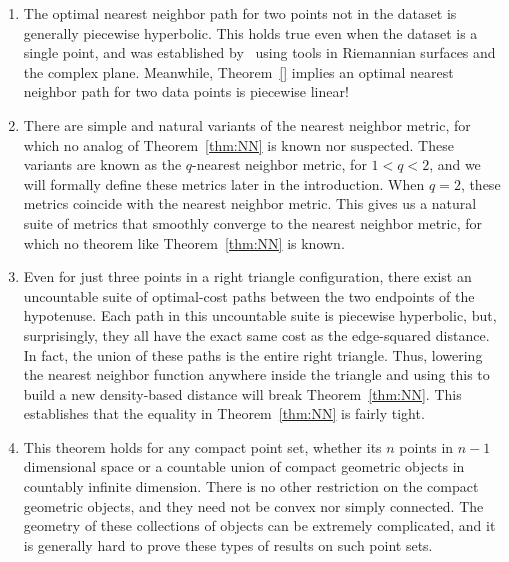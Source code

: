 \begin{enumerate}

\item The optimal nearest neighbor path for two points not in the dataset
is generally piecewise hyperbolic. This holds true even when the
dataset is a single point, and was established by~\cite{}
using tools in Riemannian surfaces and the complex plane.
Meanwhile, Theorem~\ref{} implies an optimal nearest
neighbor path for two data points is piecewise linear!

\item There are simple and natural variants of the nearest neighbor metric,
for which no analog of Theorem~\ref{thm:NN} is known nor suspected.
These variants are known as the $q$-nearest neighbor
metric, for $1 < q < 2$, and we will formally define these
metrics later in the introduction. When $q=2$, these
metrics coincide with the nearest neighbor metric.
This
gives us a natural suite of metrics that smoothly converge
to the nearest neighbor metric, for which no theorem like
Theorem~\ref{thm:NN} is known.

\item Even for just three points in a right triangle configuration, there
exist an uncountable suite of optimal-cost paths between the two
endpoints of the hypotenuse. Each path in this uncountable
suite is piecewise hyperbolic, but, surprisingly, they all
have the exact same cost as the edge-squared distance. In
fact, the union of these paths is the entire right
triangle. Thus, lowering the nearest neighbor function
anywhere inside the triangle and using this to build a new
density-based distance will break
Theorem~\ref{thm:NN}. This establishes that the equality in
Theorem~\ref{thm:NN} is fairly tight.

\item This theorem holds for any compact point set, whether its $n$ points
in $n-1$ dimensional space or a countable union of compact geometric
objects in countably infinite dimension. There is no other restriction on
the compact geometric objects, and they need not be convex nor simply
connected. The geometry of these collections of objects can be
extremely complicated, and it is generally hard to prove
these types of results on such point sets.


\end{enumerate}
